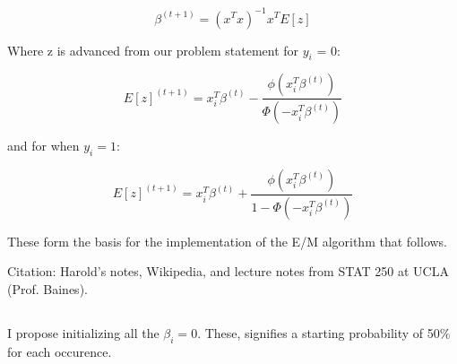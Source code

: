 \documentclass{article}\usepackage[]{graphicx}\usepackage[]{color}
\begin{document}
\[ \beta^{(t+1)} = (x^Tx)^{-1} x^T E[z] \]

Where z is advanced from our problem statement for \(y_i\) = 0:

\[ E[z]^{(t+1)} = x_i^T \beta^{(t)} - \frac{\phi(x_i^T \beta^{(t)})}{\Phi(-x_i^T \beta^{(t)})} \]

and for when \(y_i = 1\):

\[ E[z]^{(t+1)} = x_i^T \beta^{(t)} + \frac{\phi(x_i^T \beta^{(t)})}{1 - \Phi(-x_i^T \beta^{(t)})} \]


These form the basis for the implementation of the E/M algorithm that follows.

Citation: Harold's notes, Wikipedia, and lecture notes from STAT 250 at UCLA (Prof. Baines).

\subsection{}

I propose initializing all the \(\beta_i = 0\).  These, signifies a starting probability of 50\% for each occurence.

\subsection{}
\end{document}

